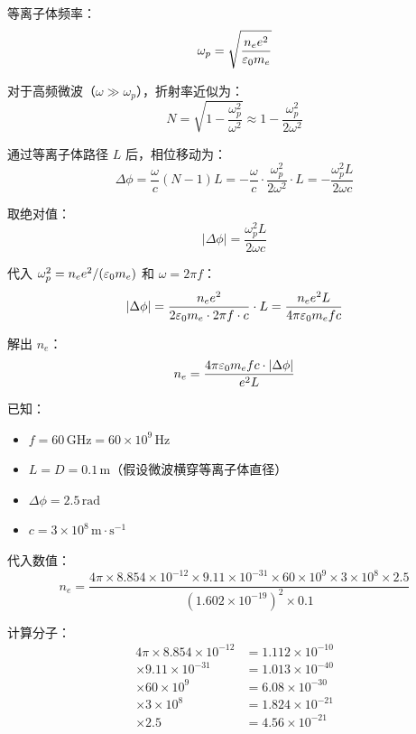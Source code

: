 等离子体频率：
\begin{equation}
    \omega_p = \sqrt{\frac{n_e e^2}{\varepsilon_0 m_e}}
\label{eq:ch12-plasma-frequency}
\end{equation}

对于高频微波（$\omega \gg \omega_p$），折射率近似为：
\begin{equation}
    N = \sqrt{1 - \frac{\omega_p^2}{\omega^2}} \approx 1 - \frac{\omega_p^2}{2\omega^2}
\label{eq:ch12-refractive-index-ex2}
\end{equation}

通过等离子体路径 $L$ 后，相位移动为：
\[
    \Delta\phi = \frac{\omega}{c}(N-1)L = -\frac{\omega}{c}\cdot\frac{\omega_p^2}{2\omega^2}\cdot L = -\frac{\omega_p^2 L}{2\omega c}
\]

取绝对值：
\begin{equation}
    |\Delta\phi| = \frac{\omega_p^2 L}{2\omega c}
\label{eq:ch12-phase-shift}
\end{equation}

代入 $\omega_p^2 = n_e e^2/(\varepsilon_0 m_e)$ 和 $\omega = 2\pi f$：
\[
    |\Delta\phi| = \frac{n_e e^2}{2\varepsilon_0 m_e \cdot 2\pi f \cdot c} \cdot L = \frac{n_e e^2 L}{4\pi\varepsilon_0 m_e f c}
\]

解出 $n_e$：
\begin{equation}
    n_e = \frac{4\pi\varepsilon_0 m_e f c \cdot |\Delta\phi|}{e^2 L}
\label{eq:ch12-density-phase}
\end{equation}

已知：
\begin{itemize}
    \item $f = 60\,\mathrm{GHz} = 60\times10^9\,\mathrm{Hz}$
    \item $L = D = 0.1\,\mathrm{m}$（假设微波横穿等离子体直径）
    \item $\Delta\phi = 2.5\,\mathrm{rad}$
    \item $c = 3\times10^8\,\mathrm{m\cdot s^{-1}}$
\end{itemize}

代入数值：
\[
    n_e = \frac{4\pi \times 8.854\times10^{-12} \times 9.11\times10^{-31} \times 60\times10^9 \times 3\times10^8 \times 2.5}{(1.602\times10^{-19})^2 \times 0.1}
\]

计算分子：
\begin{align*}
    4\pi \times 8.854\times10^{-12} &= 1.112\times10^{-10} \\
    \times 9.11\times10^{-31} &= 1.013\times10^{-40} \\
    \times 60\times10^9 &= 6.08\times10^{-30} \\
    \times 3\times10^8 &= 1.824\times10^{-21} \\
    \times 2.5 &= 4.56\times10^{-21}
\end{align*}

